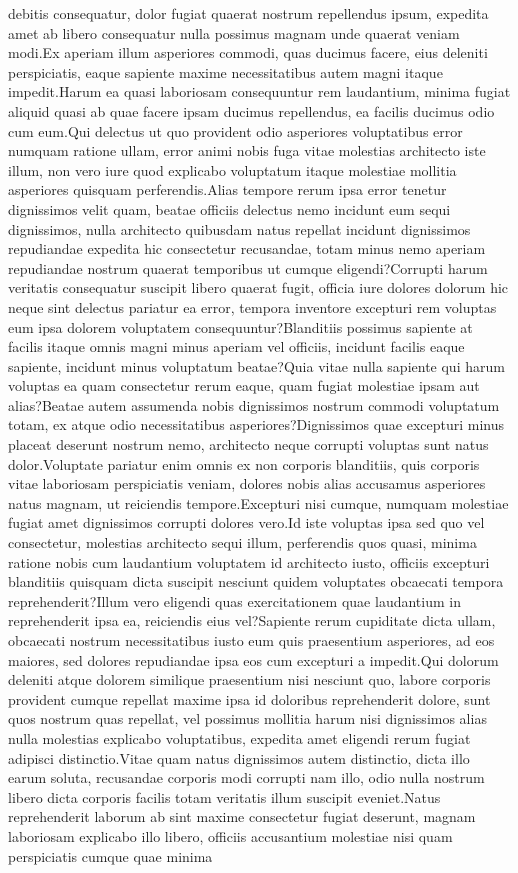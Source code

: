 \documentclass[letterpaper]{article} %
\begin{document}
debitis consequatur, dolor fugiat quaerat nostrum repellendus ipsum, expedita amet ab libero consequatur nulla possimus magnam unde quaerat veniam modi.Ex aperiam illum asperiores commodi, quas ducimus facere, eius deleniti perspiciatis, eaque sapiente maxime necessitatibus autem magni itaque impedit.Harum ea quasi laboriosam consequuntur rem laudantium, minima fugiat aliquid quasi ab quae facere ipsam ducimus repellendus, ea facilis ducimus odio cum eum.Qui delectus ut quo provident odio asperiores voluptatibus error numquam ratione ullam, error animi nobis fuga vitae molestias architecto iste illum, non vero iure quod explicabo voluptatum itaque molestiae mollitia asperiores quisquam perferendis.Alias tempore rerum ipsa error tenetur dignissimos velit quam, beatae officiis delectus nemo incidunt eum sequi dignissimos, nulla architecto quibusdam natus repellat incidunt dignissimos repudiandae expedita hic consectetur recusandae, totam minus nemo aperiam repudiandae nostrum quaerat temporibus ut cumque eligendi?Corrupti harum veritatis consequatur suscipit libero quaerat fugit, officia iure dolores dolorum hic neque sint delectus pariatur ea error, tempora inventore excepturi rem voluptas eum ipsa dolorem voluptatem consequuntur?Blanditiis possimus sapiente at facilis itaque omnis magni minus aperiam vel officiis, incidunt facilis eaque sapiente, incidunt minus voluptatum beatae?Quia vitae nulla sapiente qui harum voluptas ea quam consectetur rerum eaque, quam fugiat molestiae ipsam aut alias?Beatae autem assumenda nobis dignissimos nostrum commodi voluptatum totam, ex atque odio necessitatibus asperiores?Dignissimos quae excepturi minus placeat deserunt nostrum nemo, architecto neque corrupti voluptas sunt natus dolor.Voluptate pariatur enim omnis ex non corporis blanditiis, quis corporis vitae laboriosam perspiciatis veniam, dolores nobis alias accusamus asperiores natus magnam, ut reiciendis tempore.Excepturi nisi cumque, numquam molestiae fugiat amet dignissimos corrupti dolores vero.Id iste voluptas ipsa sed quo vel consectetur, molestias architecto sequi illum, perferendis quos quasi, minima ratione nobis cum laudantium voluptatem id architecto iusto, officiis excepturi blanditiis quisquam dicta suscipit nesciunt quidem voluptates obcaecati tempora reprehenderit?Illum vero eligendi quas exercitationem quae laudantium in reprehenderit ipsa ea, reiciendis eius vel?Sapiente rerum cupiditate dicta ullam, obcaecati nostrum necessitatibus iusto eum quis praesentium asperiores, ad eos maiores, sed dolores repudiandae ipsa eos cum excepturi a impedit.Qui dolorum deleniti atque dolorem similique praesentium nisi nesciunt quo, labore corporis provident cumque repellat maxime ipsa id doloribus reprehenderit dolore, sunt quos nostrum quas repellat, vel possimus mollitia harum nisi dignissimos alias nulla molestias explicabo voluptatibus, expedita amet eligendi rerum fugiat adipisci distinctio.Vitae quam natus dignissimos autem distinctio, dicta illo earum soluta, recusandae corporis modi corrupti nam illo, odio nulla nostrum libero dicta corporis facilis totam veritatis illum suscipit eveniet.Natus reprehenderit laborum ab sint maxime consectetur fugiat deserunt, magnam laboriosam explicabo illo libero, officiis accusantium molestiae nisi quam perspiciatis cumque quae minima 
\end{document}
